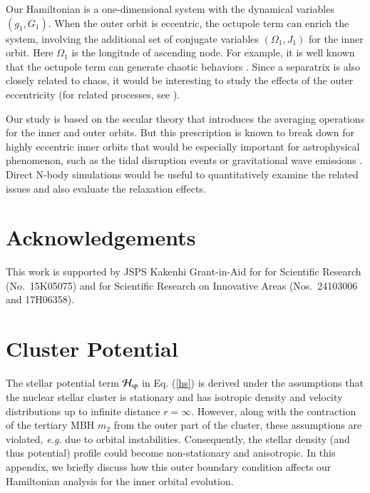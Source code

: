 \documentclass[useAMS,usenatbib,twocolumn]{mn2e}
\begin{document}
Our Hamiltonian is a one-dimensional system with the dynamical variables $(g_1,G_1)$. When the outer orbit is eccentric,  the octupole term can enrich the system,  involving the additional  set of conjugate variables $(\Omega_1,J_1)$ for the inner orbit. Here $\Omega_1$ is the longitude of ascending node.  For example, it is well known that the octupole term can generate chaotic behaviors  \citep{naoz2016}. Since a separatrix is also closely related to chaos, it would be interesting to study the effects of the outer eccentricity (for related processes, see \citealt{iwasawa2011,sesana2011,madigan2012, merritt2013,vasiliev2015}).  


Our study is based on the secular theory that introduces the averaging operations for the inner and outer orbits. But this prescription is known to break down for highly eccentric inner orbits that would be especially important for astrophysical phenomenon, such as the tidal disruption events or gravitational wave emissions \citep{katz2012,bode2014}.  Direct N-body simulations would be useful to quantitatively examine the related issues and also evaluate the relaxation effects.   



\section*{Acknowledgements}

This work is supported by JSPS Kakenhi Grant-in-Aid for  for Scientific Research (No.~15K05075)
and for Scientific Research on Innovative Areas (Nos.~24103006 and 17H06358).









\appendix
\section{Cluster Potential}



The stellar potential term ${\cal H}_{\rm sp}$ in Eq. (\ref{hs}) is derived under the assumptions that the nuclear stellar cluster is stationary and has isotropic density and velocity distributions up to infinite distance $r=\infty$. However, along with the contraction of the tertiary MBH $m_2$ from the outer part of the cluster, these assumptions are violated, {\it e.g.} due to orbital instabilities.  Consequently,  the stellar density (and thus potential) profile could become non-stationary and  anisotropic.  In this appendix, we briefly discuss how this outer boundary condition affects our Hamiltonian analysis for the inner orbital evolution. 
\end{document}
